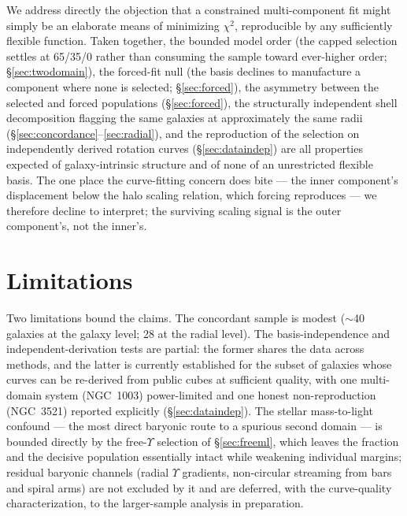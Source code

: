 \documentclass[twocolumn]{aastex701}
\begin{document}
We address directly the objection that a constrained multi-component fit might
simply be an elaborate means of minimizing $\chi^2$, reproducible by any
sufficiently flexible function. Taken together, the bounded model order (the
capped selection settles at 65/35/0 rather than consuming the sample toward
ever-higher order; \S\ref{sec:twodomain}), the forced-fit null (the basis
declines to manufacture a component where none is selected; \S\ref{sec:forced}),
the asymmetry between the selected and forced populations (\S\ref{sec:forced}),
the structurally independent shell decomposition flagging the same galaxies at
approximately the same radii (\S\ref{sec:concordance}--\ref{sec:radial}), and
the reproduction of the selection on independently derived rotation curves
(\S\ref{sec:dataindep}) are all properties expected of galaxy-intrinsic
structure and of none of an unrestricted flexible basis. The one place the curve-fitting concern does bite
--- the inner component's displacement below the halo scaling relation, which
forcing reproduces --- we therefore decline to interpret; the surviving scaling
signal is the outer component's, not the inner's.

\section{Limitations} \label{sec:limitations}

Two limitations bound the claims. The concordant sample is modest
($\sim$40 galaxies at the galaxy level; 28 at the radial level). The
basis-independence and independent-derivation tests are partial: the former shares the
data across methods, and the latter is currently established for the subset of
galaxies whose curves can be re-derived from public cubes at sufficient quality,
with one multi-domain system (NGC~1003) power-limited and one honest
non-reproduction (NGC~3521) reported explicitly (\S\ref{sec:dataindep}).
The stellar mass-to-light confound --- the most direct baryonic route to a
spurious second domain --- is bounded directly by the free-$\Upsilon$
selection of \S\ref{sec:freeml}, which leaves the fraction and the decisive
population essentially intact while weakening individual margins; residual
baryonic channels (radial $\Upsilon$ gradients, non-circular streaming from
bars and spiral arms) are not excluded by it and are deferred, with the
curve-quality characterization, to the larger-sample analysis in preparation.
\end{document}

